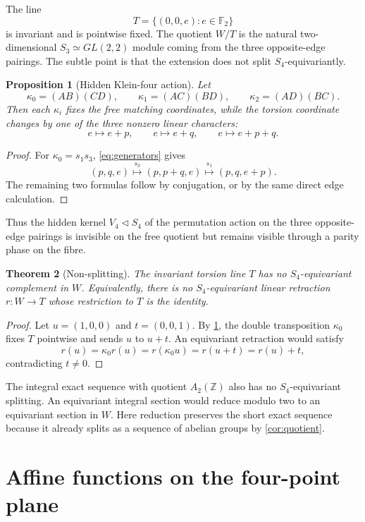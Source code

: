 \documentclass[11pt]{amsart}
\newtheorem{theorem}{Theorem}[section]
\newtheorem{proposition}[theorem]{Proposition}
\theoremstyle{definition}
\theoremstyle{remark}
\newcommand{\Z}{\mathbb Z}
\newcommand{\F}{\mathbb F}
\begin{document}
The line
\[
T=\{(0,0,e):e\in\F_2\}
\]
is invariant and is pointwise fixed. The quotient $W/T$ is the natural two-dimensional $S_3\simeq GL(2,2)$ module coming from the three opposite-edge pairings. The subtle point is that the extension does not split $S_4$-equivariantly.

\begin{proposition}[Hidden Klein-four action]\label{prop:v4}
Let
\[
\kappa_0=(AB)(CD),\qquad
\kappa_1=(AC)(BD),\qquad
\kappa_2=(AD)(BC).
\]
Then each $\kappa_i$ fixes the free matching coordinates, while the torsion coordinate changes by one of the three nonzero linear characters:
\[
e\mapsto e+p,\qquad e\mapsto e+q,\qquad e\mapsto e+p+q.
\]
\end{proposition}

\begin{proof}
For $\kappa_0=s_1s_3$, \cref{eq:generators} gives
\[
(p,q,e)\stackrel{s_3}{\longmapsto}(p,p+q,e)
\stackrel{s_1}{\longmapsto}(p,q,e+p).
\]
The remaining two formulas follow by conjugation, or by the same direct edge calculation.
\end{proof}

Thus the hidden kernel $V_4\triangleleft S_4$ of the permutation action on the three opposite-edge pairings is invisible on the free quotient but remains visible through a parity phase on the fibre.

\begin{theorem}[Non-splitting]\label{thm:nonsplit}
The invariant torsion line $T$ has no $S_4$-equivariant complement in $W$. Equivalently, there is no $S_4$-equivariant linear retraction $r:W\to T$ whose restriction to $T$ is the identity.
\end{theorem}

\begin{proof}
Let $u=(1,0,0)$ and $t=(0,0,1)$. By \cref{prop:v4}, the double transposition $\kappa_0$ fixes $T$ pointwise and sends $u$ to $u+t$. An equivariant retraction would satisfy
\[
r(u)=\kappa_0 r(u)=r(\kappa_0 u)=r(u+t)=r(u)+t,
\]
contradicting $t\ne0$.
\end{proof}

The integral exact sequence with quotient $A_2(\Z)$ also has no $S_4$-equivariant splitting. An equivariant integral section would reduce modulo two to an equivariant section in $W$. Here reduction preserves the short exact sequence because it already splits as a sequence of abelian groups by \cref{cor:quotient}.

\section{Affine functions on the four-point plane}
\end{document}
